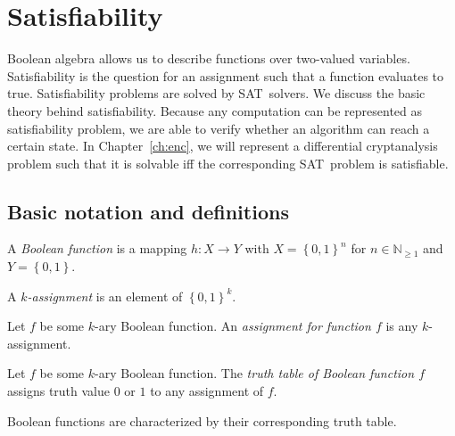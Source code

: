 \renewcommand*\chappic{img/satisfiability.pdf}
\renewcommand*\chapquote{What idiot called them logic errors rather than bool shit?}
\renewcommand*\chapquotesrc{Unknown}
\chapter{Satisfiability}
\label{ch:sat}
%
Boolean algebra allows us to describe functions over two-valued variables.
Satisfiability is the question for an assignment such that a function
evaluates to true. Satisfiability problems are solved by SAT~solvers.
We discuss the basic theory behind satisfiability. Because any computation
can be represented as satisfiability problem, we are able to verify
whether an algorithm can reach a certain state. In Chapter~\ref{ch:enc},
we will represent a differential cryptanalysis problem such that it is
solvable iff the corresponding SAT~problem is satisfiable.

\section{Basic notation and definitions}
\label{sec:sat-intro}
%
\begin{defi}
  A \emph{Boolean function} is a mapping $h: X \to Y$ with $X = \left\{0,1\right\}^n$
  for $n \in \mathbb N_{\geq 1}$ and $Y = \left\{0,1\right\}$.
\end{defi}

\begin{defi}[Assignment]
  A \emph{$k$-assignment} is an element of $\left\{0,1\right\}^k$.

  \noindent
  Let $f$ be some $k$-ary Boolean function.
  An \emph{assignment for function $f$} is any $k$-assignment.
\end{defi}

\begin{defi}
  Let $f$ be some $k$-ary Boolean function.
  The \emph{truth table of Boolean function $f$} assigns
  truth value $0$ or $1$ to any assignment of $f$.
\end{defi}

Boolean functions are characterized by their corresponding truth table.

